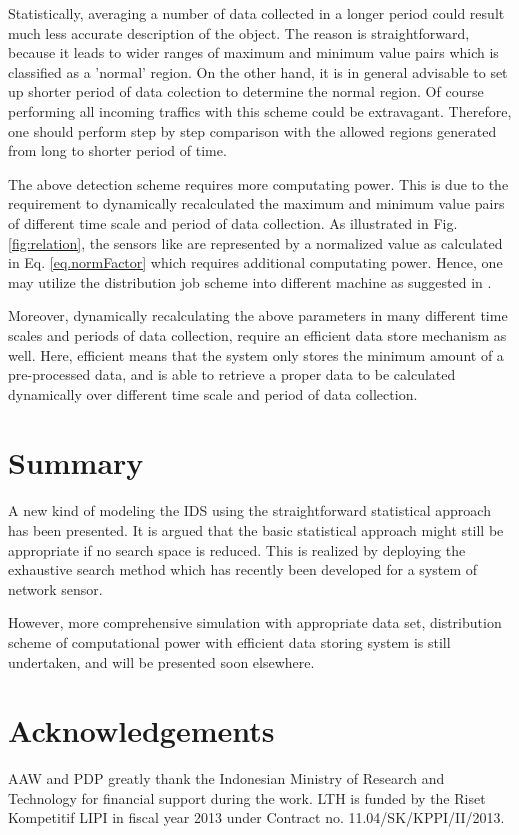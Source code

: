 \documentclass[conference,10pt,a4paper]{IEEEtran}
\begin{document}
Statistically, averaging a number of data collected in a longer period could result much less accurate  description of the object. The reason is straightforward, because it leads to wider ranges of maximum and minimum value pairs which is classified as a 'normal' region. On the other hand, it is in general advisable to set up shorter period of data colection to determine the normal region. Of course performing all incoming traffics with this scheme could be extravagant. Therefore, one should perform step by step comparison with the allowed regions generated from long to shorter period of time.

The above detection scheme requires more computating power. This is due to the requirement to dynamically recalculated the maximum and minimum value pairs of different time scale and period of data collection. As illustrated in Fig. \ref{fig:relation}, the sensors like  are represented by a normalized value as calculated in Eq. \ref{eq.normFactor} which requires additional computating power. Hence, one may utilize the distribution job scheme into different machine as suggested in \cite{arya}.

Moreover, dynamically recalculating the above parameters in many different time scales and periods of data collection, require an efficient data store mechanism as well. Here, efficient means that the system only stores the minimum amount of a pre-processed data, and is able to retrieve a proper data to be calculated dynamically over different time scale and period of data collection.

\section{Summary}
\label{sec:summary}

A new kind of modeling the IDS using the straightforward statistical approach has been presented. It is argued that the basic statistical approach might still be appropriate if no search space is reduced. This is realized by deploying the exhaustive search method which has recently been developed for a system of network sensor. 

However, more comprehensive simulation with appropriate data set, distribution scheme of computational power with efficient data storing system is still undertaken, and will be presented soon elsewhere. 

\section*{Acknowledgements}

AAW and PDP greatly thank the Indonesian Ministry of Research and Technology for financial support during the work. LTH  is funded by the Riset Kompetitif LIPI in fiscal year 2013 under Contract no.  11.04/SK/KPPI/II/2013.



\end{document}
